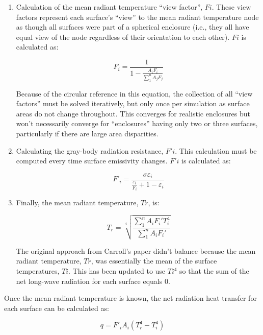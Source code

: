 \begin{enumerate}
\item Calculation of the mean radiant temperature ``view factor'', $Fi$. These view factors represent each surface's ``view'' to the mean radiant temperature node as though all surfaces were part of a spherical enclosure (i.e., they all have equal view of the node regardless of their orientation to each other). $Fi$ is calculated as:

\begin{equation}
    F_i=\frac{1}{1-\frac{A_i F_i}{\sum_1^n{A_j F_j} }}
\end{equation}

Because of the circular reference in this equation, the collection of all ``view factors'' must be solved iteratively, but only once per simulation as surface areas do not change throughout. This converges for realistic enclosures but won't necessarily converge for ``enclosures'' having only two or three surfaces, particularly if there are large area disparities.

\item Calculating the gray-body radiation resistance, $F'i$. This calculation must be computed every time surface emissivity changes. $F'i$ is calculated as:

\begin{equation}
    F'_i=\frac{\sigma\varepsilon_i}{\frac{\varepsilon_i}{F_i} +1-\varepsilon_i}
\end{equation}

\item Finally, the mean radiant temperature, $Tr$, is:

\begin{equation}
    T_r=\sqrt[4]{\frac{\sum_1^n{A_iF_i'T_i^4}}{\sum_1^n{A_iF_i'}}}
\end{equation}

The original approach from Carroll's paper didn't balance because the mean radiant temperature, $Tr$, was essentially the mean of the surface temperatures, $Ti$. This has been updated to use $Ti^4$ so that the sum of the net long-wave radiation for each surface equals 0.

\end{enumerate}

Once the mean radiant temperature is known, the net radiation heat transfer for each surface can be calculated as:

\begin{equation}
    q=F'_i A_i (T_r^4-T_i^4)
\end{equation}

